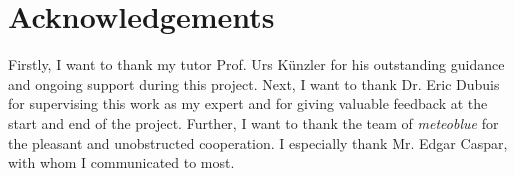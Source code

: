 \section*{Acknowledgements}
Firstly, I want to thank my tutor Prof. Urs K\"unzler for his outstanding guidance and ongoing support during this project.
\emptyline
Next, I want to thank Dr. Eric Dubuis for supervising this work as my expert and for giving valuable feedback at the start and end of the project.
\emptyline
Further, I want to thank the team of \emph{meteoblue} for the pleasant and unobstructed cooperation. I especially thank Mr. Edgar Caspar, with whom I communicated to most.

